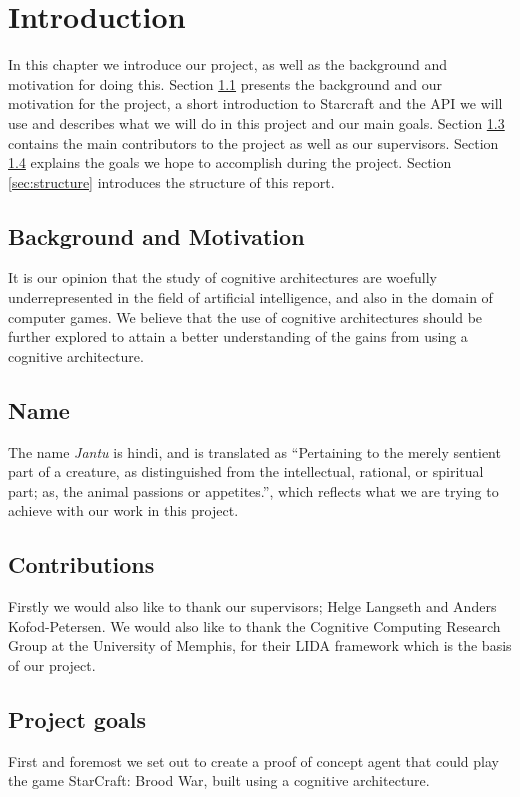 
\chapter{Introduction}
In this chapter we introduce our project, as well as the background and
motivation for doing this. Section \ref{sec:background} presents the background
and our motivation for the project, a short introduction to Starcraft and the
API we will use and describes what we will do in this project and our main
goals. Section \ref{sec:contributions} contains the main contributors to the
project as well as our supervisors. Section \ref{sec:goals} explains the goals we hope to accomplish during the project. 
Section \ref{sec:structure} introduces the
structure of this report.

\section{Background and Motivation}
\label{sec:background}
It is our opinion that the study of cognitive architectures are woefully underrepresented in the field of artificial intelligence, and also in the domain of computer games. We believe that the use of cognitive architectures should be further explored to attain a better understanding of the gains from using a cognitive architecture.

\section{Name}
\label{sec:name}
The name {\em Jantu} is hindi, and is translated as ``Pertaining to the merely sentient part of a creature, as distinguished from the intellectual, rational, or spiritual part; as, the animal passions or appetites.'', which reflects what we are trying to achieve with our work in this project.\cite{hindijantu}

\section{Contributions}
\label{sec:contributions}
Firstly we would also like to thank our supervisors; Helge Langseth and Anders Kofod-Petersen. We would also like to thank the Cognitive Computing Research Group at the University of Memphis, for their LIDA framework which is the basis of our project.

\section{Project goals}
\label{sec:goals}
First and foremost we set out to create a proof of concept agent that could play the game StarCraft: Brood War, built using a cognitive architecture.

